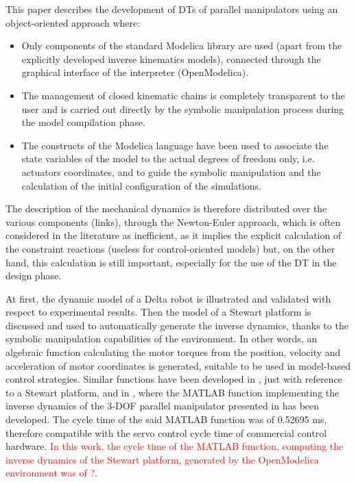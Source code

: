 \documentclass[]{interact}
\theoremstyle{plain}%
\theoremstyle{definition}
\theoremstyle{remark}
\begin{document}
This paper describes the development of DTs of parallel manipulators using an object-oriented approach where:
\begin{itemize}
  \item Only components of the standard Modelica library are used (apart from the explicitly developed inverse kinematics models), connected through the graphical interface of the interpreter (OpenModelica).
  \item The management of closed kinematic chains is completely transparent to the user and is carried out directly by the symbolic manipulation process during the model compilation phase.
  \item The constructs of the Modelica language have been used to associate the state variables of the model to the actual degrees of freedom only, i.e. actuators coordinates, and to guide the symbolic manipulation and the calculation of the initial configuration of the simulations.
\end{itemize}
The description of the mechanical dynamics is therefore distributed over the various components (links), through the Newton-Euler approach, which is often considered in the literature as inefficient, as it implies the explicit calculation of the constraint reactions (useless for control-oriented models) but, on the other hand, this calculation is still important, especially for the use of the DT in the design phase.

At first, the dynamic model of a Delta robot is illustrated and validated with respect to experimental results. Then the model of a Stewart platform is discussed and used to automatically generate the inverse dynamics, thanks to the symbolic manipulation capabilities of the environment. In other words, an algebraic function calculating the motor torques from the position, velocity and acceleration of motor coordinates is generated, suitable to be used in model-based control strategies. Similar functions have been developed in \cite{HZZ2020}, just with reference to a Stewart platform, and in \cite{XDZ16}, where the MATLAB function implementing the inverse dynamics of the 3-DOF parallel manipulator presented in \cite{1435489} has been developed. The cycle time of the said MATLAB function was of 0.52695 ms, therefore compatible with the servo control cycle time of commercial control hardware. \textcolor{red}{In this work, the cycle time of the MATLAB function, computing the inverse dynamics of the Stewart platform, generated by the OpenModelica environment was of ?}.
\end{document}
